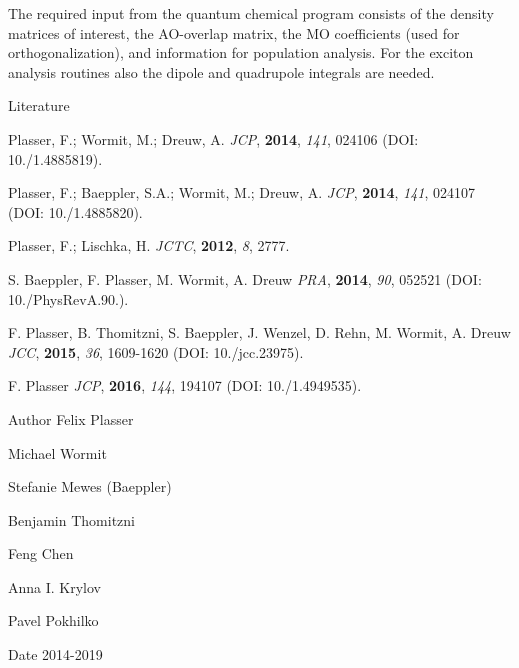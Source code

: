 The required input from the quantum chemical program consists of the density matrices of interest, the AO-\/overlap matrix, the MO coefficients (used for orthogonalization), and information for population analysis. For the exciton analysis routines also the dipole and quadrupole integrals are needed.

\begin{DoxyParagraph}{Literature}

\begin{DoxyEnumerate}
\item Plasser, F.; Wormit, M.; Dreuw, A. {\itshape JCP}, {\bfseries{2014}}, {\itshape 141}, 024106 (DOI\+: 10./1.4885819).
\item Plasser, F.; Baeppler, S.\+A.; Wormit, M.; Dreuw, A. {\itshape JCP}, {\bfseries{2014}}, {\itshape 141}, 024107 (DOI\+: 10./1.4885820).
\item Plasser, F.; Lischka, H. {\itshape JCTC}, {\bfseries{2012}}, {\itshape 8}, 2777.
\item S. Baeppler, F. Plasser, M. Wormit, A. Dreuw {\itshape PRA}, {\bfseries{2014}}, {\itshape 90}, 052521 (DOI\+: 10./\+Phys\+RevA.90.).
\item F. Plasser, B. Thomitzni, S. Baeppler, J. Wenzel, D. Rehn, M. Wormit, A. Dreuw {\itshape JCC}, {\bfseries{2015}}, {\itshape 36}, 1609-\/1620 (DOI\+: 10./jcc.23975).
\item F. Plasser {\itshape JCP}, {\bfseries{2016}}, {\itshape 144}, 194107 (DOI\+: 10./1.4949535).
\end{DoxyEnumerate}
\end{DoxyParagraph}
\begin{DoxyAuthor}{Author}
Felix Plasser 

Michael Wormit 

Stefanie Mewes (Baeppler) 

Benjamin Thomitzni 

Feng Chen 

Anna I. Krylov 

Pavel Pokhilko
\end{DoxyAuthor}
\begin{DoxyDate}{Date}
2014-\/2019
\end{DoxyDate}
